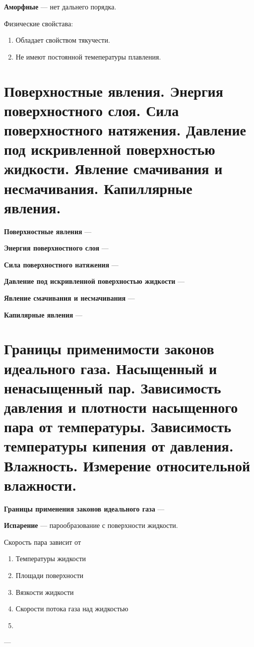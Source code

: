 \documentclass{report}
\begin{document}
{\bf Аморфные} ---
нет дальнего порядка.

Физические свойстава:
\begin{enumerate}
  \item Обладает свойством тякучести.
  \item Не имеют постоянной темепературы плавления.
\end{enumerate}



\part{Поверхностные явления.
Энергия поверхностного слоя.
Сила поверхностного натяжения.
Давление под искривленной поверхностью жидкости.
Явление смачивания и несмачивания.
Капиллярные явления.}

{\bf Поверхностные явления} ---

{\bf Энергия поверхностного слоя} ---

{\bf Сила поверхностного натяжения} ---

{\bf Давление под искривленной поверхностью жидкости} ---

{\bf Явление смачивания и несмачивания} ---

{\bf Капилярные явления} ---



\part{Границы применимости законов идеального газа. 
Насыщенный и ненасыщенный пар. 
Зависимость давления и плотности насыщенного пара от температуры. 
Зависимость температуры кипения от давления. 
Влажность.
Измерение относительной влажности.}

{\bf Границы применения законов идеального газа} ---

{\bf Испарение} ---
парообразование с поверхности жидкости.

Скорость пара зависит от 
\begin{enumerate}
  \item Температуры жидкости
  \item Площади поверхности
  \item Вязкости жидкости
  \item Скорости потока газа над жидкостью
  \item 
\end{enumerate}

{\bf } ---
\end{document}
